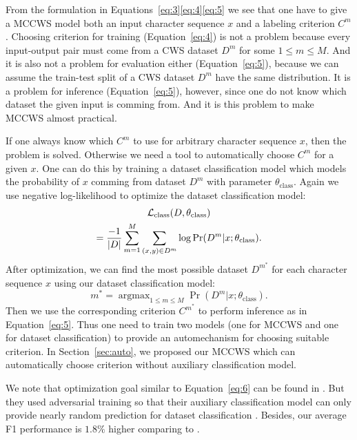 \documentclass[11pt]{article}
\newcommand{\loss}{\mathcal{L}}
\newcommand{\opClass}{\operatorname{class}}
\newcommand{\thetaC}{\theta_{\opClass}}
\DeclareMathOperator*{\argmax}{\arg\max}
\DeclarePairedDelimiter{\abs}{\lvert}{\rvert}
\begin{document}
From the formulation in Equations~\eqref{eq:3}\eqref{eq:4}\eqref{eq:5} we see that one have to give a MCCWS model both an input character sequence \(x\) and a labeling criterion \(C^m\).
Choosing criterion for training (Equation~\eqref{eq:4}) is not a problem because every input-output pair must come from a CWS dataset \(D^m\) for some \(1 \leq m \leq M\).
And it is also not a problem for evaluation either (Equation~\eqref{eq:5}), because we can assume the train-test split of a CWS dataset \(D^m\) have the same distribution.
It is a problem for inference (Equation~\eqref{eq:5}), however, since one do not know which dataset the given input is comming from.
And it is this problem to make MCCWS almost practical.

If one always know which \(C^m\) to use for arbitrary character sequence \(x\), then the problem is solved.
Otherwise we need a tool to automatically choose \(C^m\) for a given \(x\).
One can do this by training a dataset classification model which models the probability of \(x\) comming from dataset \(D^m\) with parameter \(\thetaC\).
Again we use negative log-likelihood to optimize the dataset classification model:
\begin{multline}\label{eq:6}
  \loss_{\opClass}(D, \thetaC) \\
  = \dfrac{-1}{\abs{D}} \sum_{m = 1}^M \sum_{(x, y) \in D^m} \log \Pr(D^m | x ; \thetaC).
\end{multline}
After optimization, we can find the most possible dataset \(D^{m^*}\) for each character sequence \(x\) using our dataset classification model:
\begin{equation}\label{eq:7}
  m^* = \argmax_{1 \leq m \leq M} \Pr(D^m | x ; \thetaC).
\end{equation}
Then we use the corresponding criterion \(C^{m^*}\) to perform inference as in Equation~\eqref{eq:5}.
Thus one need to train two models (one for MCCWS and one for dataset classification) to provide an automechanism for choosing suitable criterion.
In Section~\ref{sec:auto}, we proposed our MCCWS which can automatically choose criterion without auxiliary classification model.

We note that optimization goal similar to Equation~\eqref{eq:6} can be found in \citep{chen-etal-2017-adversarial}.
But they used adversarial training so that their auxiliary classification model can only provide nearly random prediction for dataset classification \citep{goodfellow-2014-gan}.
Besides, our average F1 performance is \(1.8\%\) higher comparing to \citep{chen-etal-2017-adversarial}.
\end{document}
